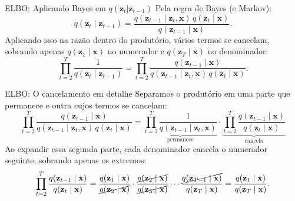 \documentclass[aspectratio=169,xcolor=dvipsnames]{beamer}
\begin{document}
  \begin{frame}{ELBO: Aplicando Bayes em $q(\mathbf{z}_t|\mathbf{z}_{t-1})$}
    Pela regra de Bayes (e Markov):
    \[
      q(\mathbf{z}_t \mid \mathbf{z}_{t-1}) = \frac{q(\mathbf{z}_{t-1} \mid \mathbf{z}_t, \mathbf{x})\, q(\mathbf{z}_t \mid \mathbf{x})}{q(\mathbf{z}_{t-1} \mid \mathbf{x})}.
    \]
    Aplicando isso na razão dentro do produtório, vários termos se
    cancelam, sobrando apenas $q(\mathbf{z}_1 \mid \mathbf{x})$ no numerador e
    $q(\mathbf{z}_T \mid \mathbf{x})$ no denominador:
    \[
      \prod_{t=2}^{T}\frac{1}{q(\mathbf{z}_t \mid \mathbf{z}_{t-1})} = \prod_{t=2}^{T}\frac{q(\mathbf{z}_{t-1} \mid \mathbf{x})}{q(\mathbf{z}_{t-1} \mid \mathbf{z}_t, \mathbf{x})\, q(\mathbf{z}_t \mid \mathbf{x})}.
    \]
  \end{frame}

  \begin{frame}{ELBO: O cancelamento em detalhe}
    Separamos o produtório em uma parte que permanece e outra cujos
    termos se cancelam:
    \[
      \prod_{t=2}^{T}\frac{q(\mathbf{z}_{t-1} \mid \mathbf{x})}{q(\mathbf{z}_{t-1} \mid \mathbf{z}_t, \mathbf{x})\, q(\mathbf{z}_t \mid \mathbf{x})}
      = \underbrace{\prod_{t=2}^{T}\frac{1}{q(\mathbf{z}_{t-1} \mid \mathbf{z}_t, \mathbf{x})}}_{\text{permanece}}
        \cdot \underbrace{\prod_{t=2}^{T}\frac{q(\mathbf{z}_{t-1} \mid \mathbf{x})}{q(\mathbf{z}_t \mid \mathbf{x})}}_{\text{cancela}}
    \]
    \vspace{0.4em}
    Ao expandir essa segunda parte, cada denominador cancela o
    numerador seguinte, sobrando apenas os extremos:
    \[
      \prod_{t=2}^{T}\frac{q(\mathbf{z}_{t-1} \mid \mathbf{x})}{q(\mathbf{z}_t \mid \mathbf{x})}
      = \frac{q(\mathbf{z}_1 \mid \mathbf{x})}{\cancel{q(\mathbf{z}_2 \mid \mathbf{x})}}\cdot
        \frac{\cancel{q(\mathbf{z}_2 \mid \mathbf{x})}}{\cancel{q(\mathbf{z}_3 \mid \mathbf{x})}}\cdots
        \frac{\cancel{q(\mathbf{z}_{T-1} \mid \mathbf{x})}}{q(\mathbf{z}_T \mid \mathbf{x})}
      = \frac{q(\mathbf{z}_1 \mid \mathbf{x})}{q(\mathbf{z}_T \mid \mathbf{x})}.
    \]
  \end{frame}
\end{document}

